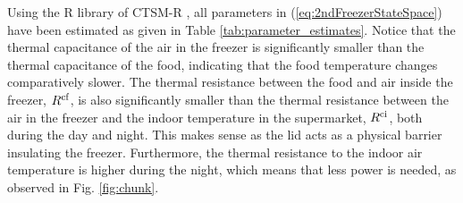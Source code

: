 \documentclass[11pt,a4paper]{article}
\begin{document}
Using the R library of CTSM-R \cite{juhl2016ctsmr}, all parameters in (\ref{eq:2ndFreezerStateSpace}) have been estimated as given in Table \ref{tab:parameter_estimates}. Notice that the thermal capacitance of the air in the freezer is significantly smaller than the thermal capacitance of the food, indicating  that the food temperature changes comparatively slower. The thermal resistance between the food and air inside the freezer, $R^{\rm{cf}}$, is also significantly smaller than the thermal resistance between the air in the freezer and the indoor temperature in the supermarket, $R^{\rm{ci}}$, both during the day and night. This makes sense as the lid acts as a physical barrier insulating the freezer. Furthermore, the thermal resistance to the indoor air temperature is higher during the night, which means that less power is needed, as  observed in Fig. \ref{fig:chunk}.

\end{document}
